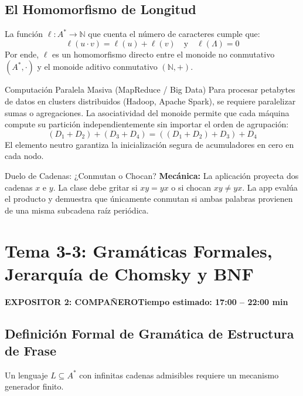 \documentclass[11pt,a4paper]{article}
\newcommand{\badgeComp}{\colorbox{exp2bg}{\textcolor{exp2fg}{\bfseries\sffamily\footnotesize EXPOSITOR 2: COMPAÑERO}}}
\begin{document}
\subsection{El Homomorfismo de Longitud}
La función $\ell: A^* \to \mathbb{N}$ que cuenta el número de caracteres cumple que:
\begin{equation}
  \ell(u \cdot v) = \ell(u) + \ell(v) \quad \text{y} \quad \ell(\Lambda) = 0
\end{equation}
Por ende, $\ell$ es un homomorfismo directo entre el monoide no conmutativo $(A^*, \cdot)$ y el monoide aditivo conmutativo $(\mathbb{N}, +)$.

\begin{aplicacion}{Computación Paralela Masiva (MapReduce / Big Data)}
Para procesar petabytes de datos en clusters distribuidos (Hadoop, Apache Spark), se requiere paralelizar sumas o agregaciones. La asociatividad del monoide permite que cada máquina compute su partición independientemente sin importar el orden de agrupación:
\begin{equation*}
  (D_1 + D_2) + (D_3 + D_4) = ((D_1 + D_2) + D_3) + D_4
\end{equation*}
El elemento neutro garantiza la inicialización segura de acumuladores en cero en cada nodo.
\end{aplicacion}

\begin{minijuego}{Duelo de Cadenas: ¿Conmutan o Chocan?}
\textbf{Mecánica:} La aplicación proyecta dos cadenas $x$ e $y$. La clase debe gritar si $xy = yx$ o si chocan $xy \neq yx$. La app evalúa el producto y demuestra que únicamente conmutan si ambas palabras provienen de una misma subcadena raíz periódica.
\end{minijuego}

\newpage

\section{Tema 3-3: Gramáticas Formales, Jerarquía de Chomsky y BNF}
\noindent\badgeComp \hfill \textbf{Tiempo estimado: 17:00 -- 22:00 min}

\subsection{Definición Formal de Gramática de Estructura de Frase}
Un lenguaje $L \subseteq A^*$ con infinitas cadenas admisibles requiere un mecanismo generador finito.
\end{document}
